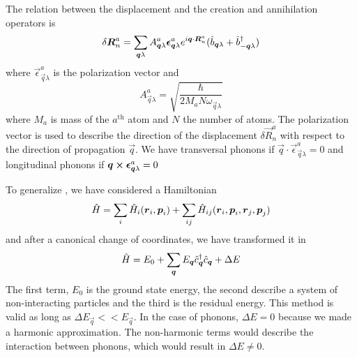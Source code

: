 The relation between the displacement and the creation and annihilation operators is
\begin{equation} \label{eq:phonon_coordinates}
    \delta \mathbf{\boldsymbol{R}}_n^a = \sum_{\mathbf{\boldsymbol{q}}\lambda} A_{\mathbf{\boldsymbol{q}}\lambda}^a \mathbf{\boldsymbol{\epsilon}}_{\mathbf{\boldsymbol{q}}\lambda}^a e^{i\mathbf{\boldsymbol{q}} \cdot \mathbf{\boldsymbol{R}}_n^a} (\hat{b}_{\mathbf{\boldsymbol{q}}\lambda} + \hat{b}^\dagger_{-\mathbf{\boldsymbol{q}}\lambda})
\end{equation}
where $\vec{\epsilon}_{\vec{q}\lambda}^a$ is the polarization vector and
\begin{equation} \label{eq:A_phonon_constant}
    A_{\vec{q}\lambda}^a = \sqrt{\frac{\hbar}{2M_aN\omega_{\vec{q}\lambda}}}
\end{equation}
where $M_a$ is mass of the $a^\text{th}$ atom and $N$ the number of atoms. The polarization vector is used to describe the direction of the displacement $\delta \vec{R}_n^a$ with respect to the direction of propagation $\vec{q}$. We have transversal phonons if $\vec{q} \cdot \vec{\epsilon}_{\vec{q}\lambda}^a = 0$ and longitudinal phonons if $\mathbf{\boldsymbol{q}} \cross \mathbf{\boldsymbol{\epsilon}}_{\mathbf{\boldsymbol{q}}\lambda}^a = 0$

To generalize \cite{cohenFundamentalsCondensedMatter}, we have considered a Hamiltonian
\begin{equation}
    \hat{H} = \sum_i \hat{H}_i(\mathbf{\boldsymbol{r}}_i, \mathbf{\boldsymbol{p}}_i) + \sum_{ij} \hat{H}_{ij}(\mathbf{\boldsymbol{r}}_i, \mathbf{\boldsymbol{p}}_i, \mathbf{\boldsymbol{r}}_j, \mathbf{\boldsymbol{p}}_j)
\end{equation}
and after a canonical change of coordinates, we have transformed it in
\begin{equation}
    \hat{H} = E_0 + \sum_{\mathbf{\boldsymbol{q}}} E_{\mathbf{\boldsymbol{q}}} \hat{c}^\dagger_{\mathbf{\boldsymbol{q}}}\hat{c}_{\mathbf{\boldsymbol{q}}} + \Delta E
\end{equation}
The first term, $E_0$ is the ground state energy, the second describe a system of non-interacting particles and the third is the residual energy. This method is valid as long as $\Delta E_\vec{q} << E_\vec{q}$. In the case of phonons, $\Delta E = 0$ because we made a harmonic approximation. The non-harmonic terms would describe the interaction between phonons, which would result in $\Delta E \neq 0$.

